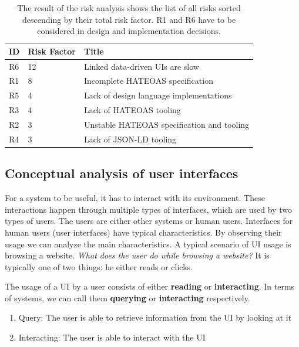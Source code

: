 \begin{table}[!htb]
  \begin{center}
    \begin{tabular}{|l|l|l|}
      \hline
      \textbf{ID} & \textbf{Risk Factor} & \textbf{Title} \\
      \hline
      \rowcolor{red}
      R6 & 12 & Linked data-driven UIs are slow \\
      \hline
      \rowcolor{yellow}
      R1 & 8 & Incomplete HATEOAS specification \\
      \hline
      R5 & 4 & Lack of design language implementations \\
      \hline
      R3 & 4 & Lack of HATEOAS tooling \\
      \hline
      R2 & 3 & Unstable HATEOAS specification and tooling \\
      \hline
      R4 & 3 & Lack of JSON-LD tooling \\
      \hline
    \end{tabular}
    \caption{The result of the risk analysis shows the list of all risks sorted descending by their total risk factor. R1 and R6 have to be considered in design and implementation decisions.}
    \label{tab:riskanalysis}
  \end{center}
\end{table}

\subsection{Conceptual analysis of user interfaces}
For a system to be useful, it has to interact with its environment. These interactions happen through multiple types of interfaces, which are used by two types of users. The users are either other systems or human users.
Interfaces for human users (user interfaces) have typical characteristics. By observing their usage we can analyze the main characteristics. A typical scenario of UI usage is browsing a website. \textit{What does the user do while browsing a website?} It is typically one of two things: he either reads or clicks.

The usage of a UI by a user consists of either \textbf{reading} or \textbf{interacting}. In terms of systems, we can call them \textbf{querying} or \textbf{interacting} respectively.

\begin{enumerate}
  \item Query: The user is able to retrieve information from the UI by looking at it
  \item Interacting: The user is able to interact with the UI
\end{enumerate}

